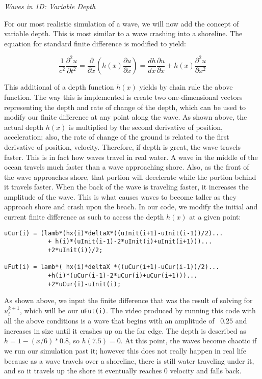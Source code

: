 \documentclass[12pt]{article}
\begin{document}
\begin{enumerate}
{\large{\item\textit{Waves in 1D: Variable Depth}}

\normalsize{For our most realistic simulation of a wave, we will now add the concept of variable depth.  This is most similar to a wave crashing into a shoreline.  The equation for standard finite difference is modified to yield:}

\[\frac{1}{c^2}\frac{\partial^2 u}{\partial t^2} = \frac{\partial}{\partial x} \left( h(x) \frac{\partial u}{\partial x} \right) = \frac{dh}{dx} \frac{\partial u}{\partial x} + h(x) \frac{\partial^2 u}{\partial x^2}\]

\normalsize{This additional of a depth function $h(x)$ yields by chain rule the above function.  The way this is implemented is create two one-dimensional vectors representing the depth and rate of change of the depth, which can be used to modify our finite difference at any point along the wave. As shown above, the actual depth $h(x)$ is multiplied by the second derivative of position, acceleration; also, the rate of change of the ground is related to the first derivative of position, velocity. Therefore, if depth is great, the wave travels faster. This is in fact how waves travel in real water. A wave in the middle of the ocean travels much faster than a wave approaching shore.  Also, as the front of the wave approaches shore, that portion will decelerate while the portion behind it travels faster. When the back of the wave is traveling faster, it increases the amplitude of the wave.  This is what causes waves to become taller as they approach shore and crash upon the beach. In our code, we modify the initial and current finite difference as such to access the depth $h(x)$ at a given point:}

\begin{verbatim}
uCur(i) = (lamb*(hx(i)*deltaX*((uInit(i+1)-uInit(i-1))/2)...
            + h(i)*(uInit(i-1)-2*uInit(i)+uInit(i+1)))...
            +2*uInit(i))/2;

uFut(i) = lamb*( hx(i)*deltaX *((uCur(i+1)-uCur(i-1))/2)...
            +h(i)*(uCur(i-1)-2*uCur(i)+uCur(i+1)))...
            +2*uCur(i)-uInit(i);

\end{verbatim}

\normalsize{As shown above, we input the finite difference that was the result of solving for $u_i^{k+1}$, which will be our \texttt{uFut(i)}.  The video produced by running this code with all the above conditions is a wave that begins with an amplitude of ~$0.25$ and increases in size until it crashes up on the far edge.  The depth is described as $h = 1 - (x/6)*0.8$, so $h(7.5) = 0$.  At this point, the waves become chaotic if we run our simulation past it; however this does not really happen in real life because as a wave travels over a shoreline, there is still water traveling under it, and so it travels up the shore it eventually reaches 0 velocity and falls back.}

}
\end{enumerate}
\end{document}
